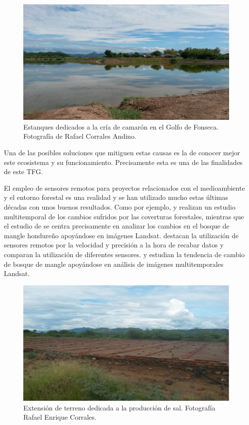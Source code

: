 \begin{figure}
	\centering
	\includegraphics[width=0.9\linewidth]{./Imagenes/Camaronera2.eps}
	\caption[Estanques de cría de camarón]{Estanques dedicados a la cría de camarón en el Golfo de Fonseca. Fotografía de Rafael Corrales Andino.}
	\label{fig:camaroneras}
\end{figure}

Una de las posibles soluciones que mitiguen estas causas es la de conocer mejor este ecosistema y su funcionamiento. Precisamente esta es una de las finalidades de este \ac{TFG}.%

El empleo de sensores remotos para proyectos relacionados con el medioambiente y el entorno forestal es una realidad y se han utilizado mucho estas últimas décadas con unos buenos resultados. Como por ejemplo, \cite{bodart2011pre} y \cite{cajacuri2011medicion} realizan un estudio multitemporal de los cambios sufridos por las coverturas forestales, mientras que el estudio de \cite{chen2013multi} se centra precisamente en analizar los cambios en el bosque de mangle hondureño apoyándose en imágenes Landsat. \cite{lee2009applying} destacan la utilización de sensores remotos por la velocidad y precisión a la hora de recabar datos y comparan la utilización de diferentes sensores. \cite{Berlanga-Robles2007} y \cite{JuelaSivisaca2013} estudian la tendencia de cambio de bosque de mangle apoyándose en análisis de imágenes multitemporales Landsat.%

\begin{figure}
	\centering
	\includegraphics[width=0.9\linewidth]{./Imagenes/Salineras.eps}
	\caption[Salineras]{Extensión de terreno dedicada a la producción de sal. Fotografía Rafael Enrique Corrales.}
	\label{fig:salinas}
\end{figure}

